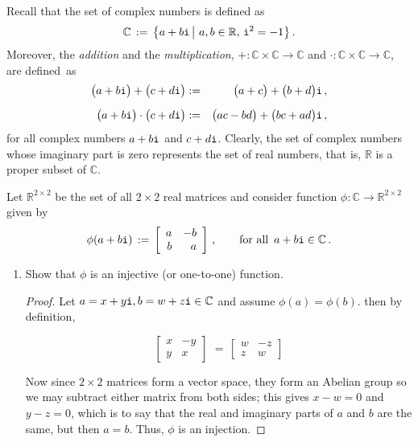 \documentclass[11pt,table]{article}
\newcommand {\mat}  [1] {\left[\begin{array}{#1}}
\newcommand {\rix}      {\end{array}\right]}
\newcommand{\<}			{\langle}
\renewcommand{\>}      		{\rangle}
\newcommand{\bC}		{\mathbb{C}}
\newcommand{\bR}		{\mathbb{R}}
\newcommand {\basicbox} 		{\begin{tcolorbox}[width=\textwidth,colback={black!1}]}
\newcommand {\overbox}      {\end{tcolorbox}}
\begin{document}
\begin{enumerate}
\basicbox
Recall that the set of complex numbers is defined as 
\begin{equation} \label{eq:complex-num-set}
\mathbb{C} 
\, := \, 
\big\{ 
a + b {\tt i} \, \big| \,\, a, b \in \bR, \, {\tt i}^2 = -1 
\big\} 
\, .
\end{equation} 
Moreover, the {\em addition} and the {\em multiplication}, 
$+: \bC \times \bC \rightarrow \bC$ 
and
$\cdot : \bC \times \bC \rightarrow \bC$, 
are defined~as 
\begin{eqnarray} \label{eq:add-cmplx-num-def}
\big( a + b {\tt i} \big) 
+ 
\big( c + d {\tt i} \big) 
& := & 
\big(a + c \big) + \big(b + d \big) {\tt i} \, ,
\\[2mm]  \label{eq:mult-cmplx-num-def}
\big( a + b {\tt i} \big) 
\cdot
\big( c + d {\tt i} \big) 
& := & 
\big(ac - bd \big) + \big(bc + ad \big) {\tt i} \, ,
\end{eqnarray} 
for all complex numbers $a+b{\tt i}$ and $c + d {\tt i}$. 
Clearly, the set of complex numbers whose imaginary part is 
zero represents the set of real numbers, 
that is, $\bR$ is a proper subset of $\bC$. 
\overbox

\medskip

Let $\bR^{2 \times 2}$ be the set of all $2 \times 2$ 
real matrices and consider function 
$\phi: \bC \rightarrow \bR^{2 \times 2}$ 
given by 
\begin{equation} \label{eq:iso-cmplx-2x2}
\phi(a + b{\tt i}) 
\, := \, 
\mat{rr}
a & -b \\
b & a 
\rix \, , 
\qquad 
\textup{for all } \, a + b {\tt i} \in \bC \, .
\end{equation}
\begin{enumerate}[\rm (a)]
\item 
Show that $\phi$ is an injective (or one-to-one) function. 


\begin{proof}
	Let $a = x + y{\tt i},  b = w + z{\tt i} \in \bC$ and assume $\phi(a) = \phi(b)$. 
	then by definition, 
	
	\begin{equation}
		\mat{rr}
		x & -y \\
		y & x 
		\rix \, 
		\, = \, 
		\mat{rr}
		w & -z \\
		z & w
		\rix
	\end{equation}

	Now since $2 \times 2$ matrices form a vector space, they form an Abelian group so we may subtract either matrix from both sides; this 
	gives $x - w = 0$ and $y - z = 0$, which is to say that the real and imaginary parts of $a$ and $b$ are the same, but then $a = b$. 
	Thus, $\phi$ is an injection. 
\end{proof}


\end{enumerate}
\end{enumerate}
\end{document}
